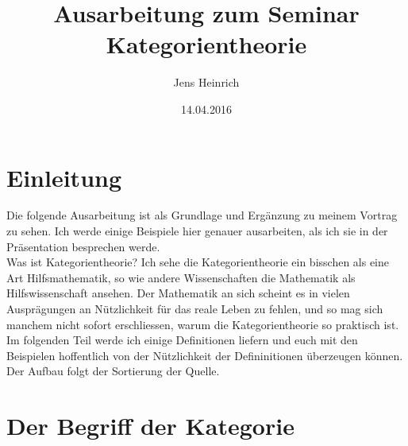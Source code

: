 \documentclass{article}
\title{Ausarbeitung zum Seminar Kategorientheorie}
\author{Jens Heinrich}
\date{14.04.2016}
\begin{document}
\maketitle
\section{Einleitung}
	Die folgende Ausarbeitung ist als Grundlage und Erg\"anzung zu meinem Vortrag zu sehen. 
	Ich werde einige Beispiele hier genauer ausarbeiten, als ich sie in der Pr\"asentation besprechen werde. \\
	Was ist Kategorientheorie? 
	Ich sehe die Kategorientheorie ein bisschen als eine Art Hilfsmathematik, so wie andere Wissenschaften die Mathematik als Hilfswissenschaft ansehen.
	Der Mathematik an sich scheint es in vielen Auspr\"agungen an N\"utzlichkeit f\"ur das reale Leben zu fehlen,
	und so mag sich manchem nicht sofort erschliessen, 
	warum die Kategorientheorie so praktisch ist.
	\\
	Im folgenden Teil werde ich einige Definitionen liefern und euch mit den Beispielen hoffentlich von der N\"utzlichkeit der Defininitionen \"uberzeugen k\"onnen. Der Aufbau folgt der Sortierung der Quelle. \nocite{Bra}
	
\section{Der Begriff der Kategorie}
	
\end{document}
